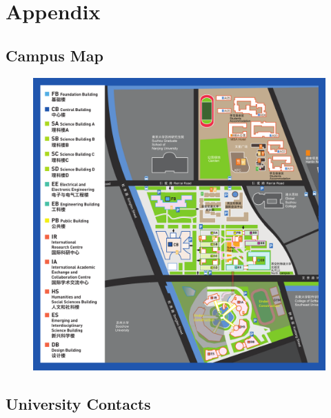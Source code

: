 \chapter{Appendix}
\label{sec.appendix}

\section{Campus Map}
\begin{figure}[H]
    \includegraphics[width=\columnwidth]{author-folder/Kai.Wu/XJTLU-campus-map.pdf}
\end{figure}

\clearpage

\section{University Contacts}

